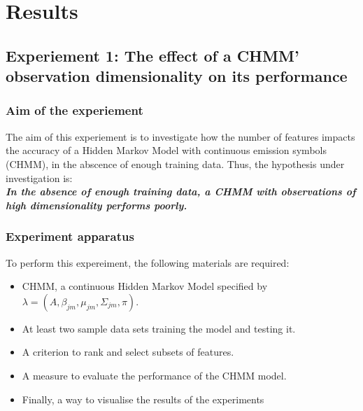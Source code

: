 \chapter{Results}

\section{Experiement 1: The effect of a CHMM' observation dimensionality on its performance}

\subsection{Aim of the experiement}
The aim of this experiement is to investigate how the number of features impacts the accuracy of a Hidden Markov Model with continuous emission symbols (CHMM), in the abscence of enough training data. Thus, the hypothesis under investigation is:\\
\textbf{\textit{In the absence of enough training data, a CHMM with observations of high dimensionality performs poorly.}}

\subsection{Experiment apparatus}
To perform this expereiment, the following materials are required:
\begin{itemize}
	\item CHMM, a continuous Hidden Markov Model specified by \(\lambda = (A, \beta_{jm}, \mu_{jm}, \Sigma_{jm}, \pi)\).
	\item At least two sample data sets training the model and testing it.
	\item A criterion to rank and select subsets of features.
	\item A measure to evaluate the performance of the CHMM model.
	\item Finally, a way to visualise the results of the experiments
\end{itemize}

